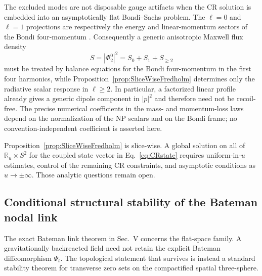 \documentclass[aps,prd,reprint,nofootinbib,superscriptaddress]{revtex4-2}
\theoremstyle{definition}
\theoremstyle{remark}
\begin{document}
The excluded modes are not disposable gauge artifacts when the CR solution is embedded into an asymptotically flat Bondi--Sachs problem. The $\ell=0$ and $\ell=1$ projections are respectively the energy and linear-momentum sectors of the Bondi four-momentum \cite{Bondi1962,Sachs1962,Szabados2009,FrauendienerStevens2021}. Consequently a generic anisotropic Maxwell flux density
\begin{equation}
 S=|\Phi_2^0|^2=S_0+S_1+S_{\ge2}
 \label{eq:FluxDecomposition}
\end{equation}
must be treated by balance equations for the Bondi four-momentum in the first four harmonics, while Proposition~\ref{prop:SliceWiseFredholm} determines only the radiative scalar response in $\ell\ge2$. In particular, a factorized linear profile already gives a generic dipole component in $|p|^2$ and therefore need not be recoil-free. The precise numerical coefficients in the mass- and momentum-loss laws depend on the normalization of the NP scalars and on the Bondi frame; no convention-independent coefficient is asserted here.

Proposition~\ref{prop:SliceWiseFredholm} is slice-wise. A global solution on all of $\mathbb R_u\times S^2$ for the coupled state vector in Eq.~\eqref{eq:CRstate} requires uniform-in-$u$ estimates, control of the remaining CR constraints, and asymptotic conditions as $u\to\pm\infty$. Those analytic questions remain open.

\subsection{Conditional structural stability of the Bateman nodal link}
\label{subsec:NodalStability}

The exact Bateman link theorem in Sec.~V concerns the flat-space family. A gravitationally backreacted field need not retain the explicit Bateman diffeomorphism $\Psi_t$. The topological statement that survives is instead a standard stability theorem for transverse zero sets on the compactified spatial three-sphere.
\end{document}
